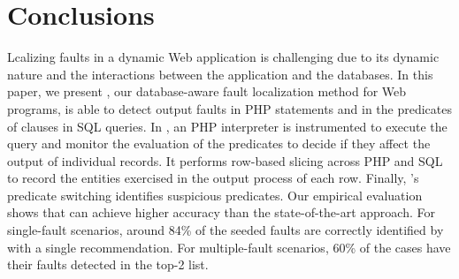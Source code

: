 \section{Conclusions}


Lcalizing faults in a dynamic Web application is challenging due to
its dynamic nature and the interactions between the application and
the databases. In this paper, we present {\tool}, our database-aware
fault localization method for Web programs, is able to detect output
faults in PHP statements and in the predicates of  clauses
in SQL queries. In {\tool}, an PHP interpreter is instrumented to
execute the query and monitor the evaluation of the predicates to
decide if they affect the output of individual records. It performs
row-based slicing across PHP and SQL to record the entities exercised
in the output process of each row. Finally, {\tool}'s predicate
switching identifies suspicious predicates. Our empirical evaluation
shows that {\tool} can achieve higher accuracy than the
state-of-the-art approach. For single-fault scenarios, around 84\% of
the seeded faults are correctly identified by {\tool} with a single
recommendation. For multiple-fault scenarios, 60\% of the cases have
their faults detected in the top-2 list.


